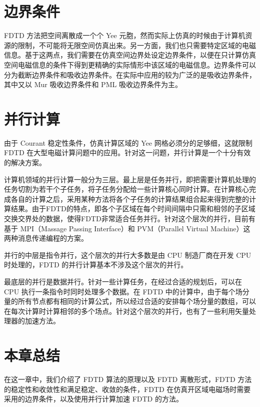 \section{边界条件}
FDTD 方法把空间离散成一个个 Yee 元胞，然而实际上仿真的时候由于计算机资源的限制，不可能将无限空间仿真出来。另一方面，我们也只需要特定区域的电磁信息。基于这两点，我们需要在仿真空间边界处设定边界条件，以便在只计算仿真空间电磁信息的条件下得到更精确的实际情形中该区域的电磁信息。边界条件可以分为截断边界条件和吸收边界条件。在实际中应用的较为广泛的是吸收边界条件，其中又以 Mur 吸收边界条件和 PML 吸收边界条件为主。


%

%

\section{并行计算}

由于 Courant 稳定性条件，仿真计算区域的 Yee 网格必须分的足够细，这就限制 FDTD 在大型电磁计算问题中的应用。针对这一问题，并行计算是一个十分有效的解决方案。

计算机领域的并行计算一般分为三层。最上层是任务并行，即把需要计算机处理的任务切割为若干个子任务，将子任务分配给一些计算核心同时计算。在计算核心完成各自的计算之后，采用某种方法将各个子任务的计算结果组合起来得到完整的计算结果。由于FDTD的特点，即各个子区域在每个时间间隔中只需和相邻的子区域交换交界处的数据，使得FDTD非常适合任务并行。针对这个层次的并行，目前有基于 MPI（Massage Passing Interface）和 PVM（Parallel Virtual Machine）这两种消息传递编程的方案。

并行的中层是指令并行，这个层次的并行大多数是由 CPU 制造厂商在开发 CPU 时处理的，FDTD 的并行计算基本不涉及这个层次的并行。

最底层的并行是数据并行。针对一些计算任务，在经过合适的规划后，可以在 CPU 执行一条指令时同时处理多个数据。在 FDTD 中的计算中，由于每个场分量的所有节点都有相同的计算公式，所以经过合适的安排每个场分量的数组，可以在每次计算时计算相邻的多个场点。针对这个层次的并行，也有了一些利用矢量处理器的加速方法。

\section{本章总结}

在这一章中，我们介绍了 FDTD 算法的原理以及 FDTD 离散形式，FDTD 方法的稳定性和收敛性和满足稳定、收敛的条件，FDTD 在仿真开区域电磁场时需要采用的边界条件，以及使用并行计算加速 FDTD 的方法。